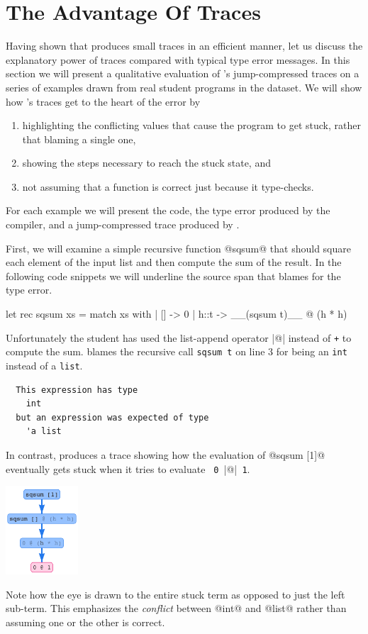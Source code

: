 \section{The Advantage Of Traces}
\label{sec:advantage-traces}
Having shown that \toolname produces small traces in an efficient
manner, let us discuss the explanatory power of traces compared with
typical type error messages. In this section we will present a
qualitative evaluation of \toolname's jump-compressed traces on a series
of examples drawn from real student programs in the \ucsdbench
dataset. We will show how \toolname's traces get to the heart of the
error by
%
\begin{enumerate}
\item highlighting the conflicting values that cause the program to get
  stuck, rather that blaming a single one,
\item showing the steps necessary to reach the stuck state, and
\item not assuming that a function is correct just because it type-checks.
\end{enumerate}
%
For each example we will present the code, the type error produced by
the \ocaml compiler, and a jump-compressed trace produced by \toolname.


First, we will examine a simple recursive function @sqsum@ that should
square each element of the input list and then compute the sum of the
result. In the following code snippets we will underline the source span
that \ocaml blames for the type error.
%
\begin{ecode}
  let rec sqsum xs = match xs with
    | [] -> 0
    | h::t -> __(sqsum t)__ @ (h * h)
\end{ecode}
%
Unfortunately the student has used the list-append operator |@| instead
of \texttt{+} to compute the sum. \ocaml blames the recursive call
\texttt{sqsum t} on line 3 for being an \texttt{int} instead of a
\texttt{list}.
%
\begin{verbatim}
  This expression has type
    int
  but an expression was expected of type
    'a list
\end{verbatim}
%
In contrast, \toolname produces a trace showing how the evaluation of
@sqsum [1]@ eventually gets stuck when it tries to evaluate
\texttt{ 0 }|@|\texttt{ 1}.
%
\begin{center}
  \includegraphics[height=125px]{sqsum.png}
\end{center}
%
Note how the eye is drawn to the entire stuck term as opposed to just
the left sub-term. This emphasizes the \emph{conflict} between @int@ and
@list@ rather than assuming one or the other is correct.


